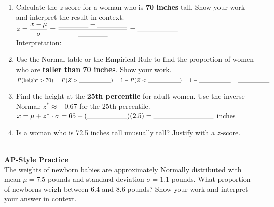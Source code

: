 \documentclass[10pt]{article}
\begin{document}
\begin{enumerate}[leftmargin=1.5em, itemsep=10pt]

  \item Calculate the $z$-score for a woman who is \textbf{70 inches} tall.
        Show your work and interpret the result in context.\\[6pt]
        $z = \dfrac{x - \mu}{\sigma} = \dfrac{\blank{1.5cm} - \blank{1.5cm}}{\blank{1.5cm}} = \blank{2cm}$\\[6pt]
        Interpretation: \writeline

  \item Use the Normal table or the Empirical Rule to find the proportion of women
        who are \textbf{taller than 70 inches}. Show your work.\\[6pt]
        $P(\text{height} > 70) = P(Z > \blank{2cm}) = 1 - P(Z < \blank{2cm}) = 1 - \blank{2cm} = \blank{2cm}$

  \item Find the height at the \textbf{25th percentile} for adult women.
        Use the inverse Normal: $z^* \approx -0.67$ for the 25th percentile.\\[6pt]
        $x = \mu + z^* \cdot \sigma = 65 + (\blank{2cm})(2.5) = \blank{3cm}$ inches

  \item Is a woman who is 72.5 inches tall unusually tall? Justify with a $z$-score.\\[5pt]
        \writeline\\[1pt]\writeline

\end{enumerate}

\vspace{0.16in}

\begin{tcolorbox}[colback=redbg, colframe=redacc, boxrule=0.8pt, arc=2mm,
    left=4mm, right=4mm, top=3mm, bottom=3mm]
\small\textbf{AP-Style Practice}\\[6pt]
The weights of newborn babies are approximately Normally distributed with mean
$\mu = 7.5$ pounds and standard deviation $\sigma = 1.1$ pounds. What proportion
of newborns weigh between 6.4 and 8.6 pounds? Show your work and interpret
your answer in context.\\[10pt]
\writeline\\[1pt]\writeline\\[1pt]\writeline
\end{tcolorbox}
\end{document}
